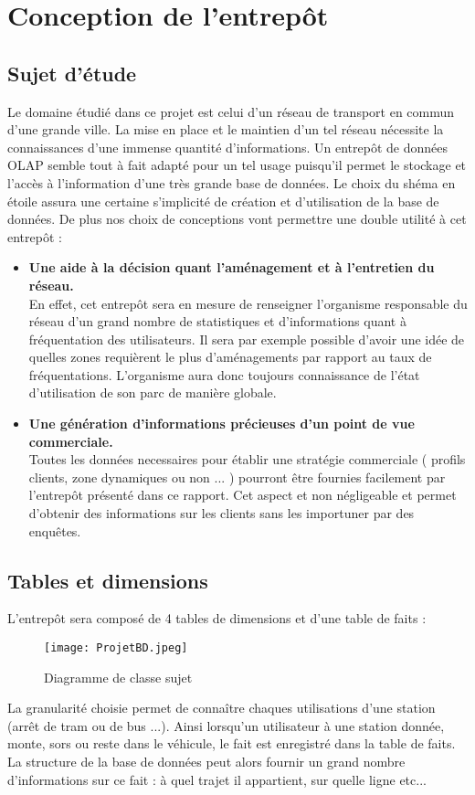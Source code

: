 \chapter{Conception de l'entrepôt}
\section{Sujet d'étude}
Le domaine étudié dans ce projet est celui d'un réseau de transport en commun d'une grande ville.
La mise en place et le maintien d'un tel réseau nécessite la connaissances d'une immense quantité d'informations.
Un entrepôt de données OLAP semble tout à fait adapté pour un tel usage puisqu'il permet le stockage et l'accès à l'information d'une très grande base de données.
Le choix du shéma en étoile assura une certaine s'implicité de création et d'utilisation de la base de données.
De plus nos choix de conceptions vont permettre une double utilité à cet entrepôt :

\begin{itemize}
  \item 
    \textbf{Une aide à la décision quant l'aménagement et à l'entretien du réseau.}\\
  En effet, cet entrepôt sera en mesure de renseigner l'organisme responsable du réseau d'un grand nombre de  statistiques et d'informations quant à fréquentation des utilisateurs.
  Il sera par exemple possible d'avoir une idée de quelles zones requièrent le plus d'aménagements par rapport au taux de fréquentations.
  L'organisme aura donc toujours connaissance de l'état d'utilisation de son parc de manière globale.
  \item	
  \textbf{Une génération d'informations précieuses d'un point de vue commerciale.}\\
    Toutes les données necessaires pour établir une stratégie commerciale ( profils clients, zone dynamiques ou non ... ) pourront être fournies facilement par l'entrepôt présenté dans ce rapport.  
    Cet aspect et non négligeable et permet d'obtenir des informations sur les clients sans les importuner par des enquêtes.
\end{itemize}


\section{Tables et dimensions}
L'entrepôt sera composé de 4 tables de dimensions et d'une table de faits : 
\begin{figure}[!h] 
\centering
  \texttt{[image: ProjetBD.jpeg]}
  \caption{Diagramme de classe sujet}
\end{figure} 

La granularité choisie permet de connaître chaques utilisations d'une station (arrêt de tram ou de bus ...).
Ainsi lorsqu'un utilisateur à une station donnée, monte, sors ou reste dans le véhicule, le fait est enregistré dans la table de faits. 
La structure de la base de données peut alors fournir un grand nombre d'informations sur ce fait : à quel trajet il appartient, sur quelle ligne etc...
